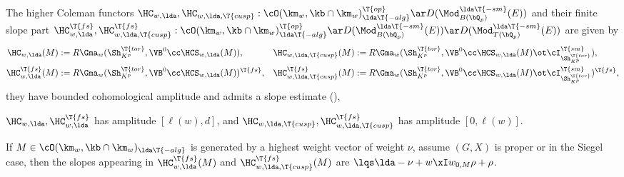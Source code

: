 \documentclass[article, a4paper, twoside]{universal}
\begin{document}
\begin{stp}
    The higher Coleman functors $\HC_{w,\lda},\HC_{w,\lda,\T{cusp}}:\cO(\km_{w},\kb\cap\km_{w})_{\lda\T{-alg}}^{\T{op}}\ar D(\Mod_{B(\bQ_{p})}^{\lda\T{-sm}}(E))$ and their finite slope part $\HC_{w,\lda}^{\T{fs}},\HC_{w,\lda,\T{cusp}}^{\T{fs}}:\cO(\km_{w},\kb\cap\km_{w})_{\lda\T{-alg}}^{\T{op}}\ar D(\Mod_{B(\bQ_{p})}^{\lda\T{-sm}}(E))\ar D(\Mod_{T(\bQ_{p})}^{\lda\T{-sm}}(E))$ are given by
    \begin{align*}
      \HC_{w,\lda}(M)&:=R\Gma_{w}(\Sh_{K^{p}}^{\T{tor}},\VB^{0}\cc\HCS_{w,\lda}(M)),& \HC_{w,\lda,\T{cusp}}(M)&:=R\Gma_{w}(\Sh_{K^{p}}^{\T{tor}},\VB^{0}\cc\HCS_{w,\lda}(M)\ot\cI_{\Sh_{K^{p}}^{\T{tor}}}^{\T{sm}}),\\
      \HC_{w,\lda}^{\T{fs}}(M)&:=R\Gma_{w}(\Sh_{K^{p}}^{\T{tor}},\VB^{0}\cc\HCS_{w,\lda}(M))^{\T{fs}},& \HC_{w,\lda,\T{cusp}}^{\T{fs}}(M)&:=R\Gma_{w}(\Sh_{K^{p}}^{\T{tor}},\VB^{0}\cc\HCS_{w,\lda}(M)\ot\cI_{\Sh_{K^{p}}^{\T{tor}}}^{\T{sm}})^{\T{fs}},
    \end{align*}
    they have bounded cohomological amplitude and admits a slope estimate (\cite[4.6.45, 4.6.58, 4.6.60]{BCGP2025}),
    \begin{itm}
        \item $\HC_{w,\lda},\HC_{w,\lda}^{\T{fs}}$ has amplitude $[\ell(w),d]$, and $\HC_{w,\lda,\T{cusp}},\HC_{w,\lda,\T{cusp}}^{\T{fs}}$ has amplitude $[0,\ell(w)]$.
        \item If $M\in\cO(\km_{w},\kb\cap\km_{w})_{\lda\T{-alg}}$ is generated by a highest weight vector of weight $\nu$, assume $(G,X)$ is proper or in the Siegel case, then the slopes appearing in $\HC_{w,\lda}^{\T{fs}}(M)$ and $\HC_{w,\lda,\T{cusp}}^{\T{fs}}(M)$ are $\lqs\lda-\nu+w\xI w_{0,M}\rho+\rho$.
    \end{itm}
\end{stp}
\end{document}
